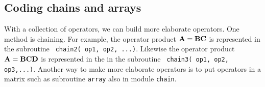 %
%
%


\subsection{Coding chains and arrays}

With a collection of operators,
we can build more elaborate operators.
One method is chaining.
For example, the operator product
$\bold A = \bold B \bold C$
is represented in the subroutine 
\texttt{ chain2( op1, op2, ...)}.
Likewise the operator product
$\bold A = \bold B \bold C \bold D$
is represented in the in the subroutine 
\texttt{ chain3( op1, op2, op3,...)}.
Another way to make more elaborate operators
is to put operators in a matrix
such as subroutine \texttt{array}
also in module \texttt{chain}.


